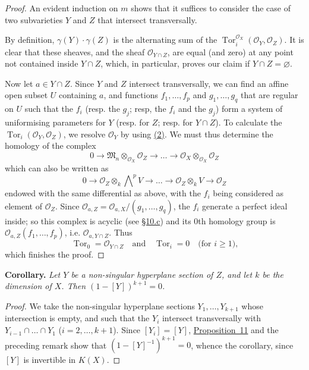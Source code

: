 \documentclass{article}
\newenvironment{itenv}[1]
  {\phantomsection\par\medskip\noindent\textbf{#1.}\itshape}
  {\medskip}
\newcommand{\scr}[1]{{\mathscr{#1}}}
\renewcommand{\geq}{\geqslant}
\DeclareMathOperator{\Tor}{Tor}
\newcommand{\oldpage}[1]{\marginpar{\footnotesize$\Big\vert$ \textit{p.~#1}}}
\begin{document}
\begin{proof}
  An evident induction on $m$ shows that it suffices to consider the case of two subvarieties $Y$ and $Z$ that intersect transversally.

  By definition, $\gamma(Y)\cdot\gamma(Z)$ is the alternating sum of the $\Tor_i^{\scr{O}_X}(\scr{O}_Y,\scr{O}_Z)$.
  It is clear that these sheaves, and the sheaf $\scr{O}_{Y\cap Z}$, are equal (and zero) at any point not contained inside $Y\cap Z$, which, in particular, proves our claim if $Y\cap Z=\varnothing$.

  Now let $a\in Y\cap Z$.
  Since $Y$ and $Z$ intersect transversally, we can find an affine open subset $U$ containing $a$, and functions $f_1,\ldots,f_p$ and $g_1,\ldots,g_q$ that are regular on $U$ such that the $f_i$ (resp. the $g_j$; resp, the $f_i$ and the $g_j$) form a system of uniformising parameters for $Y$ (resp. for $Z$; resp. for $Y\cap Z$).
  To calculate the $\Tor_i(\scr{O}_Y,\scr{O}_Z)$, we resolve $\scr{O}_Y$ by using \hyperref[section10cequation2]{(2)}.
  We must thus determine the homology of the complex
  \[
    0 \to \mathfrak{M}_n\otimes_{\scr{O}_X}\scr{O}_Z \to \ldots \to \scr{O}_X\otimes_{\scr{O}_X}\scr{O}_Z
  \]
  which can also be written as
  \[
    0 \to \scr{O}_Z\otimes_k\bigwedge\nolimits^p V \to \ldots \to \scr{O}_Z\otimes_k V \to \scr{O}_Z
  \]
  endowed with the same differential as above, with the $f_i$ being considered as element of $\scr{O}_Z$.
  Since $\scr{O}_{a,Z} = \scr{O}_{a,X}/(g_1,\ldots,g_q)$, the $f_i$ generate a perfect ideal inside;
  so this complex is acyclic (see \hyperref[subsection10c]{\S10.c}) and its $0$th homology group is $\scr{O}_{a,Z}(f_1,\ldots,f_p)$, i.e. $\scr{O}_{a,Y\cap Z}$.
  Thus
  \[
    \Tor_0 = \scr{O}_{Y\cap Z}
    \quad\text{and}\quad
    \Tor_i = 0
    \quad\mbox{(for $i\geq1$),}
  \]
  which finishes the proof.
\end{proof}

\oldpage{122}
\begin{itenv}{Corollary}
\label{corollary-11}
  Let $Y$ be a non-singular hyperplane section of $Z$, and let $k$ be the dimension of $X$.
  Then $(1-[Y])^{k+1}=0$.
\end{itenv}

\begin{proof}
  We take the non-singular hyperplane sections $Y_1,\ldots,Y_{k+1}$ whose intersection is empty, and such that the $Y_i$ intersect transversally with $Y_{i-1}\cap\ldots\cap Y_1$ ($i=2,\ldots,k+1$).
  Since $[Y_i]=[Y]$, \hyperref[proposition11]{Proposition~11} and the preceding remark show that $(1-[Y]^{-1})^{k+1} = 0$, whence the corollary, since $[Y]$ is invertible in $K(X)$.
\end{proof}
\end{document}
